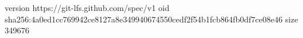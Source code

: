version https://git-lfs.github.com/spec/v1
oid sha256:4a0ed1cc769942ce8127a8e349940674550cedf2f54b1fcb864fb0df7ce08e46
size 349676
